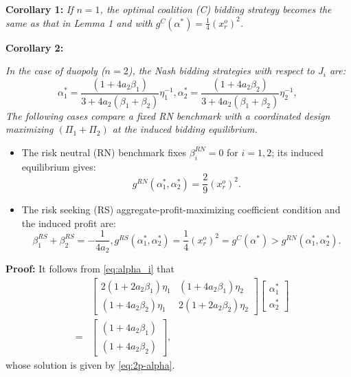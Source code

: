 \documentclass[journal]{IEEEtran}
\begin{document}
\noindent  \textbf{Corollary 1:} {\it If $n=1$, the optimal coalition (C) bidding strategy becomes the same as that in Lemma 1 and with $g^C(\alpha^*)=\frac{1}{4} (x_r^o)^2$.}

\noindent  \textbf{Corollary 2:} {\it In the case of duopoly ($n=2$), the Nash bidding strategies with respect to $J_i$ are:
\begin{subequations}
\label{eq:2p-alpha}
\begin{equation}
\alpha_1^*= \frac{(1+4a_2\beta_1)}{3+4a_2(\beta_1+\beta_2)}\eta_1^{-1}, 
\label{eq:2p-alpha1}
\end{equation} 
\begin{equation}
 \alpha_2^*= \frac{(1+4a_2\beta_2)}{3+4a_2(\beta_1+\beta_2)}\eta_2^{-1}, \, 
\label{eq:2p-alpha2}
\end{equation} 
\end{subequations}
The following cases compare a fixed RN benchmark with a coordinated design maximizing $(\Pi_1+\Pi_2)$ at the induced bidding equilibrium.
\begin{itemize}
\item The risk neutral (RN) benchmark fixes $\beta_i^{RN}=0$ for $i=1,2$; its induced equilibrium gives:
\begin{equation}
g^{RN}(\alpha_1^*, \alpha_2^*)  =  \frac{2}{9}(x_r^o)^2. 
\label{eq:2p-neutral}
\end{equation} 
\item The risk seeking (RS) aggregate-profit-maximizing coefficient condition and the induced profit are:
\begin{subequations}
\label{eq:2p-RS}
\begin{equation}
\beta_1^{RS}+\beta_2^{RS}=-\frac{1}{4a_2},
\label{eq:2p-RS-beta}
\end{equation} 
\begin{equation}
g^{RS}(\alpha_1^*,\alpha_2^*) = \frac{1}{4}(x_r^o)^2 = g^C(\alpha^*)   > g^{RN}(\alpha_1^*, \alpha_2^*). 
\label{eq:2p-RS-g}
\end{equation} 
\end{subequations}
\end{itemize} }

 \noindent \textbf{Proof:} It follows from \eqref{eq:alpha_i} that 
 \begin{eqnarray*}
  && \begin{bmatrix} 2(1+2a_2 \beta_1)\eta_1 & (1+4a_2\beta_1)\eta_2  \\ (1+4a_2\beta_2)\eta_1  & 2(1+2a_2 \beta_2)\eta_2  \end{bmatrix}   
  \begin{bmatrix}  \alpha_1^* \\ \alpha_2^* \end{bmatrix}  \\
  & = &  \begin{bmatrix}  (1+4a_2\beta_1) \\ (1+4a_2\beta_2)\end{bmatrix},
      \end{eqnarray*}
 whose solution is given by \eqref{eq:2p-alpha}.
\end{document}
